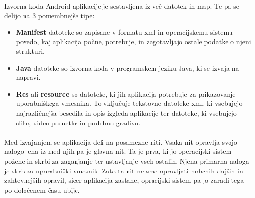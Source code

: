 \paragraph{}Izvorna koda Android aplikacije je sestavljena iz več datotek in map. Te pa se delijo na 3 pomembnejše tipe:
\begin{itemize}
  \setlength\itemsep{0em}
  \item {\bf Manifest} datoteke so zapisane v formatu xml\cite{xml-wiki} in operacijskemu sistemu povedo, kaj aplikacija počne, potrebuje, in zagotavljajo ostale podatke o njeni strukturi.
  \item {\bf Java} datoteke so izvorna koda v programskem jeziku Java, ki se izvaja na napravi.
  \item {\bf Res} ali {\bf resource} so datoteke, ki jih aplikacija potrebuje za prikazovanje uporabniškega vmesnika. To vključuje tekstovne datoteke xml, ki vsebujejo najrazličnejša besedila in opis izgleda aplikacije ter datoteke, ki vsebujejo slike, video posnetke in podobno gradivo.
\end{itemize}

\paragraph{}Med izvajanjem se aplikacija deli na posamezne niti. Vsaka nit opravlja svojo nalogo, ena iz med njih pa je glavna nit. Ta je prva, ki jo operacijski sistem požene in skrbi za zaganjanje ter ustavljanje vseh ostalih. Njena primarna naloga je skrb za uporabniški vmesnik. Zato ta nit ne sme opravljati nobenih dajših in zahtevnejših opravil, sicer aplikacija zastane, opracijski sistem pa jo zaradi tega po določenem času ubije.
